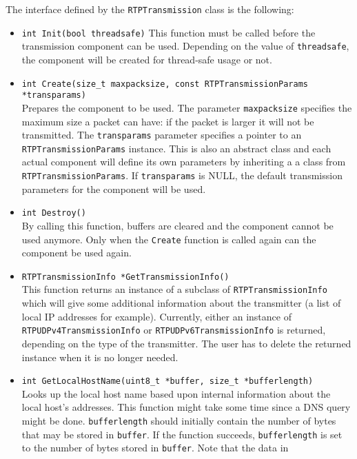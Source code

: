 \documentclass[12pt,a4paper]{article}
\begin{document}
				The interface defined by the {\tt RTPTransmission} class is the
				following:
				\begin{itemize}
					\item {\tt int Init(bool threadsafe)}
						This function must be called before the transmission component
						can be used. Depending on the value of {\tt threadsafe}, the
						component will be created for thread-safe usage or not.
					\item {\tt int Create(size\_t maxpacksize, const RTPTransmissionParams *transparams)}\\
						Prepares the component to be used. The parameter {\tt maxpacksize}
						specifies the maximum size a packet can have: if the packet
						is larger it will not be transmitted. The {\tt transparams}
						parameter specifies a pointer to an {\tt RTPTransmissionParams}
						instance. This is also an abstract class and each actual
						component will define its own parameters by inheriting a
						a class from {\tt RTPTransmissionParams}. If {\tt transparams}
						is NULL, the default transmission parameters for the component
						will be used.
					\item {\tt int Destroy()}\\
						By calling this function, buffers are cleared and the component
						cannot be used anymore. Only when the {\tt Create} function is
						called again can the component be used again.
					\item {\tt RTPTransmissionInfo *GetTransmissionInfo()}\\
					    This function returns an instance of a subclass of {\tt RTPTransmissionInfo}
						which will give some additional information about the transmitter
						(a list of local IP addresses for example). Currently, either
						an instance of {\tt RTP\-UDPv4\-Trans\-mission\-Info} or {\tt RTP\-UDPv6\-Trans\-mission\-Info}
						is returned, depending on the type of the transmitter. The user
						has to delete the returned instance when it is no longer needed.
					\item {\tt int GetLocalHostName(uint8\_t *buffer, size\_t *bufferlength)}\\
						Looks up the local host name based upon internal information about
						the local host's addresses. This function might take some time
						since a DNS query might be done. {\tt bufferlength} should initially
						contain the number of bytes that may be stored in {\tt buffer}.
						If the function succeeds, {\tt bufferlength} is set to the 
						number of bytes stored in {\tt buffer}. Note that the data in

\end{itemize}
\end{document}
